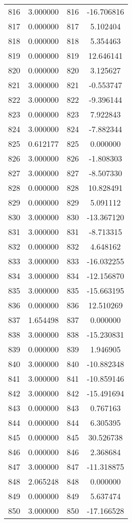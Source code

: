 \documentclass[12pt]{article}
\begin{document}
\begin{longtable}{@{}cccc@{}}
816 & 3.000000 & 816 & -16.706816 \\
817 & 0.000000 & 817 & 5.102404 \\
818 & 0.000000 & 818 & 5.354463 \\
819 & 0.000000 & 819 & 12.646141 \\
820 & 0.000000 & 820 & 3.125627 \\
821 & 3.000000 & 821 & -0.553747 \\
822 & 3.000000 & 822 & -9.396144 \\
823 & 0.000000 & 823 & 7.922843 \\
824 & 3.000000 & 824 & -7.882344 \\
825 & 0.612177 & 825 & 0.000000 \\
826 & 3.000000 & 826 & -1.808303 \\
827 & 3.000000 & 827 & -8.507330 \\
828 & 0.000000 & 828 & 10.828491 \\
829 & 0.000000 & 829 & 5.091112 \\
830 & 3.000000 & 830 & -13.367120 \\
831 & 3.000000 & 831 & -8.713315 \\
832 & 0.000000 & 832 & 4.648162 \\
833 & 3.000000 & 833 & -16.032255 \\
834 & 3.000000 & 834 & -12.156870 \\
835 & 3.000000 & 835 & -15.663195 \\
836 & 0.000000 & 836 & 12.510269 \\
837 & 1.654498 & 837 & 0.000000 \\
838 & 3.000000 & 838 & -15.230831 \\
839 & 0.000000 & 839 & 1.946905 \\
840 & 3.000000 & 840 & -10.882348 \\
841 & 3.000000 & 841 & -10.859146 \\
842 & 3.000000 & 842 & -15.491694 \\
843 & 0.000000 & 843 & 0.767163 \\
844 & 0.000000 & 844 & 6.305395 \\
845 & 0.000000 & 845 & 30.526738 \\
846 & 0.000000 & 846 & 2.368684 \\
847 & 3.000000 & 847 & -11.318875 \\
848 & 2.065248 & 848 & 0.000000 \\
849 & 0.000000 & 849 & 5.637474 \\
850 & 3.000000 & 850 & -17.166528 \\

\end{longtable}
\end{document}
